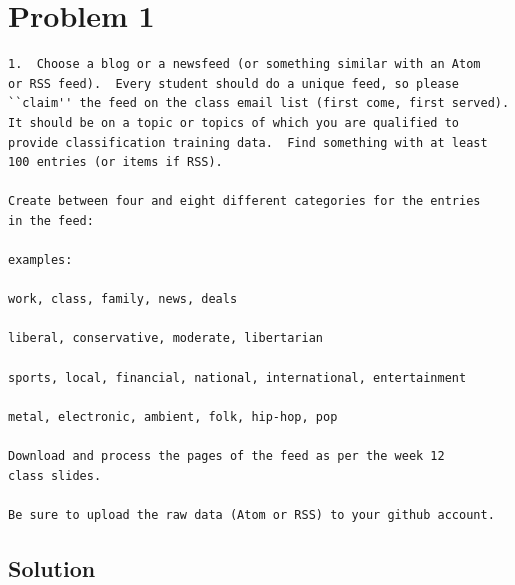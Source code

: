  
\section{Problem 1}
\label{part1}
\begin{verbatim}
1.  Choose a blog or a newsfeed (or something similar with an Atom
or RSS feed).  Every student should do a unique feed, so please
``claim'' the feed on the class email list (first come, first served).
It should be on a topic or topics of which you are qualified to
provide classification training data.  Find something with at least
100 entries (or items if RSS).

Create between four and eight different categories for the entries
in the feed:

examples: 

work, class, family, news, deals

liberal, conservative, moderate, libertarian

sports, local, financial, national, international, entertainment

metal, electronic, ambient, folk, hip-hop, pop

Download and process the pages of the feed as per the week 12 
class slides.

Be sure to upload the raw data (Atom or RSS) to your github account.
\end{verbatim}

\subsection{Solution}

